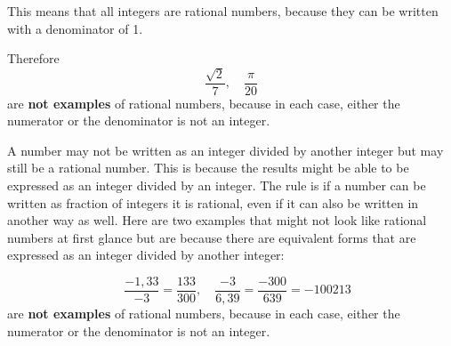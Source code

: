 \documentclass[10pt,a4paper,titlepage,twoside,openright]{report}
\begin{document}


This means that all integers are rational numbers, because they can be written with a denominator of 1.

Therefore 
\begin{equation}
\frac{\sqrt{2}}{7}, \quad \frac{\pi}{20}
\end{equation}
are \textbf{not examples} of rational numbers, because in each case, either the numerator or the denominator is not an integer.

A number may not be written as an integer divided by another integer but may still
be a rational number. This is because the results might be able to be expressed
as an integer divided by an integer. The rule is if a number can be written
as fraction of integers it is rational, even if it can also be written in another
way as well. Here are two examples that might not look like rational numbers
at first glance but are because there are equivalent forms that are expressed as an
integer divided by another integer:

\begin{equation}
\quad \frac{-1,33}{-3} = \frac{133}{300}, \quad \frac{-3}{6,39} = \frac{-300}{639} = {-100}{213}
\end{equation}
are \textbf{not examples} of rational numbers, because in each case, either the numerator or the denominator is not an integer.


\end{document}
